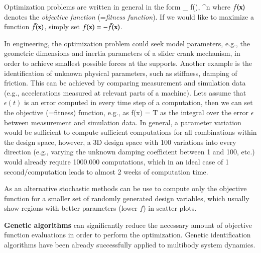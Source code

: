Optimization problems are written in general in the form
\be
  \min\limits_{\xv} f(\xv), \quad \xv \in \Rcal^n \eqComma
\ee
where $f(\mathbf{x})$ denotes the {\it objective function} (={\it fitness function}). If we would like to maximize a function $\bar f(\mathbf{x})$, simply set $f(\mathbf{x})=-\bar f(\mathbf{x})$.

In engineering, the optimization problem could seek model parameters, e.g., the geometric dimensions and inertia parameters of a slider crank mechanism, in order to achieve smallest possible forces at the supports.
Another example is the identification of unknown physical parameters, such as stiffness, damping of friction. This can be achieved by comparing measurement and simulation data (e.g., accelerations measured at relevant parts of a machine). Lets assume that $\epsilon(t)$ is an error computed in every time step of a computation, then we can set the objective (=fitness) function, e.g., as 
\be
  f(x) =  T 
\ee
as the integral over the error $\epsilon$ between measurement and simulation data.
In general, a parameter variation would be sufficient to compute sufficient computations for all combinations within the design space, however, a 3D design space with 100 variations into every direction (e.g., varying the unknown damping coefficient between 1 and 100, etc.) would already require 1000.000 computations, which in an ideal case of 1 second/computation leads to almost 2 weeks of computation time.

As an alternative stochastic methods can be use to compute only the objective function for a smaller set of randomly generated design variables, which usually show regions with better parameters (lower $f$) in scatter plots.

{\bf Genetic algorithms}\cite{Goldberg1989, Whitley1994} can significantly reduce the necessary amount of objective function evaluations in order to perform the optimization. Genetic identification algorithms have been already successfully applied to multibody system dynamics\cite{Eder2014}. 


